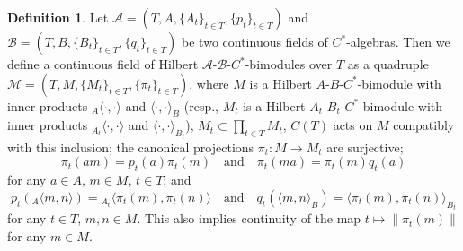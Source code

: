 \documentclass[12pt]{amsart}
\theoremstyle{definition}
\newtheorem{defn}[thm]{Definition}
\begin{document}
\begin{defn}\label{def2}
Let $\mathcal A=(T,A,\{A_t\}_{t\in T},\{p_t\}_{t\in T})$ and $\mathcal B=(T,B,\{B_t\}_{t\in T},\{q_t\}_{t\in T})$ be two continuous fields of $C^*$-algebras. Then we define a continuous field of Hilbert $\mathcal A$-$\mathcal B$-$C^*$-bimodules over $T$ as a quadruple $\mathcal M=(T,M,\{M_{t}\}_{t\in T},\{\pi_t\}_{t\in T})$, where $M$ is a Hilbert $A$-$B$-$C^*$-bimodule with inner products ${}_A\langle\cdot,\cdot\rangle$ and $\langle\cdot,\cdot\rangle_B$ (resp., $M_{t}$ is a Hilbert $A_t$-$B_t$-$C^*$-bimodule with inner products ${}_{A_t}\langle\cdot,\cdot\rangle$ and $\langle\cdot,\cdot\rangle_{B_t}$), $M_{t}\subset\prod_{t\in T}M_{t}$, $C(T)$ acts on $M$ compatibly with this inclusion; the canonical projections $\pi_{t}:M\to M_{t}$ are surjective; 
\begin{equation}\label{def_eq1}
\pi_t(am)=p_t(a)\pi_t(m)\quad \mbox{and} \quad  \pi_t(ma)=\pi_t(m)q_t(a) 
\end{equation}
for any $a\in A$, $m\in M$, $t\in T$;
and 
\begin{equation}\label{def_eq2}
p_t({}_A\langle m,n\rangle)={}_{A_t}\langle \pi_{t}(m),\pi_{t}(n)\rangle \quad\mbox{and}\quad q_t(\langle m,n\rangle_B)=\langle \pi_t(m),\pi_t(n)\rangle_{B_t}
\end{equation}
for any $t\in T$, $m,n\in M$. This also implies continuity of the map $t\mapsto\|\pi_t(m)\|$ for any $m\in M$.  

\end{defn}
 
\end{document}
